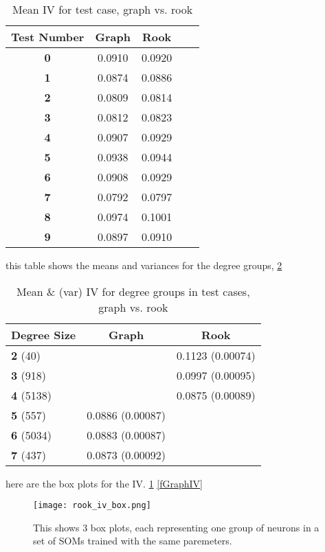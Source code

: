 \begin{table}
\caption{Mean IV for test case, graph vs. rook}
\label{ivtable3}
\begin{tabular}{|c||c|c|c|c|}
\hline
\textbf{Test Number} & Graph & Rook \\
\hline
\hline
\textbf{0} & 0.0910 & 0.0920 \\
\hline
\textbf{1} & 0.0874 & 0.0886 \\
\hline
\textbf{2} & 0.0809 & 0.0814 \\
\hline
\textbf{3} & 0.0812 & 0.0823 \\
\hline
\textbf{4} & 0.0907 & 0.0929 \\
\hline
\textbf{5} & 0.0938 & 0.0944 \\
\hline
\textbf{6} & 0.0908 & 0.0929 \\
\hline
\textbf{7} & 0.0792 & 0.0797 \\
\hline
\textbf{8} & 0.0974 & 0.1001 \\
\hline
\textbf{9} & 0.0897 & 0.0910 \\
\hline
\end{tabular} \end{table}


this table shows the means and variances for the degree groups, \ref{meanvar1}


\begin{table}
\caption{Mean \& (var) IV for degree groups in test cases, graph vs. rook}
\label{meanvar1}
\begin{tabular}{|l|c|c|}
\hline
\textbf{Degree Size} & \textbf{Graph} & \textbf{Rook} \\
\hline
\textbf{2}   (40) & & 0.1123 (0.00074)  \\
\textbf{3}  (918) & & 0.0997 (0.00095)  \\
\textbf{4} (5138) & & 0.0875 (0.00089)  \\
\textbf{5}  (557) &   0.0886 (0.00087) &\\
\textbf{6} (5034) &   0.0883 (0.00087) &\\
\textbf{7}  (437) &   0.0873 (0.00092) &\\
\hline
\end{tabular} \end{table}



here are the box plots for the IV. \ref{fRookIV} \ref{fGraphIV}


\begin{figure}
\centering
\texttt{[image: rook\_iv\_box.png]}
\caption{This shows 3 box plots, each representing one group of neurons in a set
of SOMs trained with the same paremeters.}
\label{fRookIV}
\end{figure}

